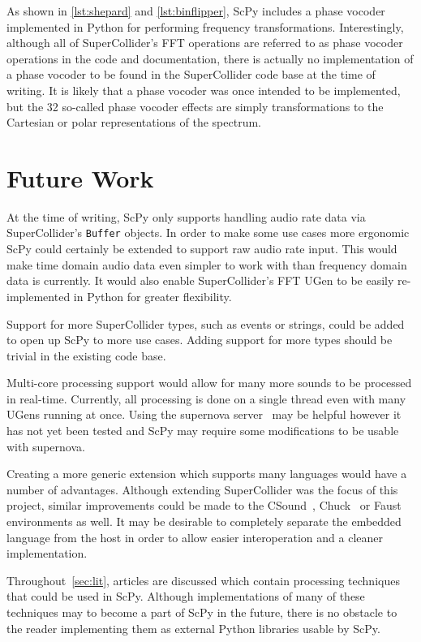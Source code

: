 \documentclass{article}
\begin{document}
As shown in \autoref{lst:shepard} and \autoref{lst:binflipper}, ScPy includes a phase vocoder
implemented in Python for performing frequency transformations. Interestingly, although all of
SuperCollider's FFT operations are referred to as phase vocoder operations in the code and
documentation, there is actually no implementation of a phase vocoder to be found in the
SuperCollider code base at the time of writing. It is likely that a phase vocoder was once intended
to be implemented, but the 32 so-called phase vocoder effects are simply transformations to the
Cartesian or polar representations of the spectrum.

\section{Future Work}

At the time of writing, ScPy only supports handling audio rate data via SuperCollider's
\texttt{Buffer} objects. In order to make some use cases more ergonomic ScPy could certainly be
extended to support raw audio rate input. This would make time domain audio data even
simpler to work with than frequency domain data is currently. It would also enable SuperCollider's
FFT UGen to be easily re-implemented in Python for greater flexibility.

Support for more SuperCollider types, such as events or strings, could be added to open up ScPy to
more use cases. Adding support for more types should be trivial in the existing code base.

Multi-core processing support would allow for many more sounds to be processed in real-time.
Currently, all processing is done on a single thread even with many UGens running at once. Using
the supernova server~\cite{blechmann2005supernova} may be helpful however it has not yet been
tested and ScPy may require some modifications to be usable with supernova.

Creating a more generic extension which supports many languages would have a number of advantages.
Although extending SuperCollider was the focus of this project, similar improvements could be made
to the CSound~\cite{boulanger2000csound,lazzarini2005extensions}, Chuck~\cite{wang2008chuck} or
Faust~\cite{orlarey2009faust} environments as well. It may be desirable to completely separate the
embedded language from the host in order to allow easier interoperation and a cleaner
implementation.

Throughout~\autoref{sec:lit}, articles are discussed which contain processing techniques that could
be used in ScPy. Although implementations of many of these techniques may to become a part of ScPy
in the future, there is no obstacle to the reader implementing them as external Python libraries
usable by ScPy.
\end{document}
